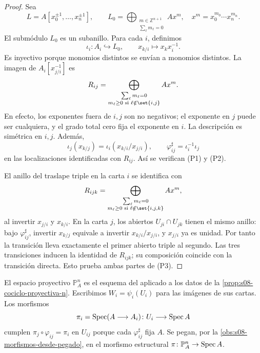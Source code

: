 \begin{center}
\end{center}
\begin{proof}
Sea
\[
L=A[x_0^{\pm1},\ldots,x_n^{\pm1}],\qquad
L_0=\bigoplus_{\substack{m\in\mathbb Z^{n+1}\\ \sum_\ell m_\ell=0}}Ax^m,
\quad x^m=x_0^{m_0}\cdots x_n^{m_n}.
\]
El submódulo $L_0$ es un subanillo. Para cada $i$, definimos
\[
\iota_i\colon A_i\hookrightarrow L_0,\qquad x_{k/i}\longmapsto x_kx_i^{-1}.
\]
Es inyectivo porque monomios distintos se envían a monomios distintos. La imagen de $A_i[x_{j/i}^{-1}]$ es
\[
R_{ij}=\bigoplus_{\substack{\sum_\ell m_\ell=0\\m_\ell\geq0\text{ si }\ell\notin\set{i,j}}}Ax^m.
\]
En efecto, los exponentes fuera de $i,j$ son no negativos; el exponente en $j$ puede ser cualquiera, y el grado total cero fija el exponente en $i$. La descripción es simétrica en $i,j$. Además,
\[
\iota_j(x_{k/j})=\iota_i(x_{k/i}/x_{j/i}),
\qquad \varphi_{ij}^\sharp=\iota_i^{-1}\iota_j
\]
en las localizaciones identificadas con $R_{ij}$. Así se verifican (P1) y (P2).

El anillo del traslape triple en la carta $i$ se identifica con
\[
R_{ijk}=\bigoplus_{\substack{\sum_\ell m_\ell=0\\m_\ell\geq0\text{ si }\ell\notin\set{i,j,k}}}Ax^m,
\]
al invertir $x_{j/i}$ y $x_{k/i}$. En la carta $j$, los abiertos $U_{ji}\cap U_{jk}$ tienen el mismo anillo: bajo $\varphi_{ij}^\sharp$, invertir $x_{k/j}$ equivale a invertir $x_{k/i}/x_{j/i}$, y $x_{j/i}$ ya es unidad. Por tanto la transición lleva exactamente el primer abierto triple al segundo. Las tres transiciones inducen la identidad de $R_{ijk}$; su composición coincide con la transición directa. Esto prueba ambas partes de (P3).
\end{proof}

\begin{defi}
\label{defi:s08-espacio-proyectivo}
El espacio proyectivo $\mathbb P^n_A$ es el esquema del  aplicado a los datos de la \cref{prop:s08-cociclo-proyectiva-n}. Escribimos $W_i=\psi_i(U_i)$ para las imágenes de sus cartas. Los morfismos
\[
\pi_i=\operatorname{Spec}(A\longrightarrow A_i)\colon U_i\longrightarrow\operatorname{Spec} A
\]
cumplen $\pi_j\circ\varphi_{ij}=\pi_i$ en $U_{ij}$ porque cada $\varphi_{ij}^\sharp$ fija $A$. Se pegan, por la \cref{obs:s08-morfismos-desde-pegado}, en el morfismo estructural $\pi\colon \mathbb P^n_A\to\operatorname{Spec} A$.
\end{defi}

